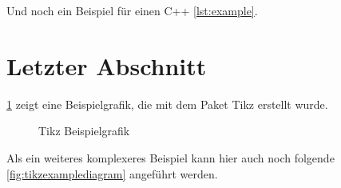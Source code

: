 \noindent Und noch ein Beispiel für einen C++ \cref{lst:example}.

\clearpage

\section{Letzter Abschnitt}\label{sec:last} %

\cref{fig:tikzexamplegraphics} zeigt eine Beispielgrafik, die mit dem Paket \glqq Tikz\grqq{} erstellt wurde.

\begin{figure}[!ht]
    \centering
    \caption{Tikz Beispielgrafik}
    \label{fig:tikzexamplegraphics} %
\end{figure}

\noindent Als ein weiteres komplexeres Beispiel kann hier auch noch folgende \cref{fig:tikzexamplediagram} angeführt werden.

